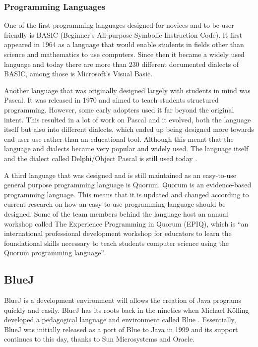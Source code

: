 \subsubsection{Programming Languages}
One of the first programming languages designed for novices and to be user friendly is BASIC (Beginner's All-purpose Symbolic Instruction Code). It first appeared in 1964 as a language that would enable students in fields other than science and mathematics to use computers. Since then it became a widely used language and today there are more than 230 different documented dialects of BASIC, among those is Microsoft's Visual Basic.

Another language that was originally designed largely with students in mind was Pascal. It was released in 1970 and aimed to teach students structured programming. However, some early adopters used it far beyond the original intent. This resulted in a lot of work on Pascal and it evolved, both the language itself but also into different dialects, which ended up being designed more towards end-user use rather than an educational tool. Although this meant that the language and dialects became very popular and widely used. The language itself and the dialect called Delphi/Object Pascal is still used today \cite{tiobe}.

A third language that was designed and is still maintained as an easy-to-use general purpose programming language is Quorum. Quorum is an evidence-based programming language. This means that it is updated and changed according to current research on how an easy-to-use programming language should be designed. Some of the team members behind the language host an annual workshop called The Experience Programming in Quorum (EPIQ), which is ``an international professional development workshop for educators to learn the foundational skills necessary to teach students computer science using the Quorum programming language''\cite{quorum_epiq}.

\subsection{BlueJ}
BlueJ is a development environment will allows the creation of Java programs quickly and easily. BlueJ has its roots back in the nineties when Michael Kölling developed a pedagogical language and environment called Blue \cite{bluej_overview}. Essentially, BlueJ was initially released as a port of Blue to Java in 1999 and its support continues to this day, thanks to Sun Microsystems and Oracle.

